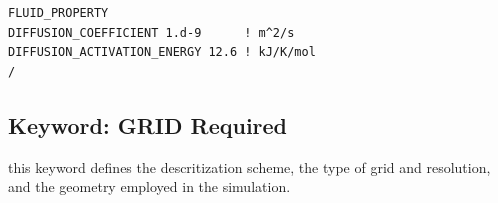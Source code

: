 \documentclass[12pt]{article}
\begin{document}
\begin{verbatim}
FLUID_PROPERTY
DIFFUSION_COEFFICIENT 1.d-9      ! m^2/s
DIFFUSION_ACTIVATION_ENERGY 12.6 ! kJ/K/mol
/
\end{verbatim}


\newpage
\protect\hypertarget{target_grid}{}

\subsection{Keyword: GRID \hfill Required}

 this keyword defines the descritization scheme, the type of grid and resolution, and the geometry employed in the simulation.
\end{document}
